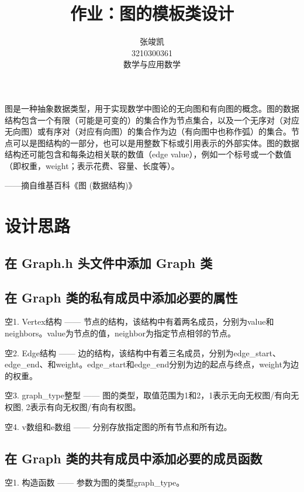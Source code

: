 \documentclass[UTF8]{ctexart}
\title{作业：图的模板类设计}
\author{张竣凯 \\ 3210300361 \\ 数学与应用数学}
\begin{document}
\maketitle

图是一种抽象数据类型，用于实现数学中图论的无向图和有向图的概念。图的数据结构包含一个有限（可能是可变的）的集合作为节点集合，以及一个无序对（对应无向图）或有序对（对应有向图）的集合作为边（有向图中也称作弧）的集合。节点可以是图结构的一部分，也可以是用整数下标或引用表示的外部实体。图的数据结构还可能包含和每条边相关联的数值（edge value），例如一个标号或一个数值（即权重，weight；表示花费、容量、长度等）。

\begin{flushright}
——摘自维基百科《图 (数据结构)》
\end{flushright}

\section{设计思路}

\subsection{在 Graph.h 头文件中添加 Graph 类}

\subsection{在 Graph 类的私有成员中添加必要的属性}

\hphantom 空1. Vertex结构 —— 节点的结构，该结构中有着两名成员，分别为value和neighbors。value为节点的值，neighbor为指定节点相邻的节点。\newline

\hphantom 空2. Edge结构 —— 边的结构，该结构中有着三名成员，分别为edge\_start、edge\_end、和weight。edge\_start和edge\_end分别为边的起点与终点，weight为边的权重。\newline

\hphantom 空3. graph\_type整型 —— 图的类型，取值范围为1和2，1表示无向无权图/有向无权图, 2表示有向无权图/有向有权图。\newline

\hphantom 空4. v数组和e数组 —— 分别存放指定图的所有节点和所有边。

\subsection{在 Graph 类的共有成员中添加必要的成员函数}
\hphantom 空1. 构造函数 —— 参数为图的类型graph\_type。\newline
\end{document}
